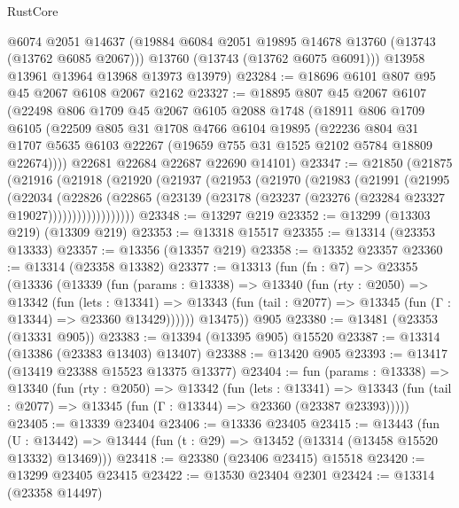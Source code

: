 \begin{lexlean}{RustCore}
\begin{coremodule}
        @6074
        @2051
        @14637
        (@19884 @6084 @2051 @19895 @14678 @13760 (@13743 (@13762 @6085 @2067)))
        @13760
        (@13743 (@13762 @6075 @6091)))
      @13958
      @13961
      @13964
      @13968
      @13973
      @13979)
@23284 := @18696 @6101 @807 @95 @45 @2067 @6108 @2067 @2162
@23327 := @18895
    @807
    @45
    @2067
    @6107
    (@22498
      @806
      @1709
      @45
      @2067
      @6105
      @2088
      @1748
      (@18911
        @806
        @1709
        @6105
        (@22509
          @805
          @31
          @1708
          @4766
          @6104
          @19895
          (@22236
            @804
            @31
            @1707
            @5635
            @6103
            @22267
            (@19659 @755 @31 @1525 @2102 @5784 @18809 @22674))))
      @22681
      @22684
      @22687
      @22690
      @14101)
@23347 := @21850
    (@21875
      (@21916
        (@21918
          (@21920
            (@21937
              (@21953
                (@21970
                  (@21983
                    (@21991
                      (@21995
                        (@22034
                          (@22826
                            (@22865
                              (@23139
                                (@23178 (@23237 (@23276 (@23284 @23327 @19027))))))))))))))))))
@23348 := @13297 @219
@23352 := @13299 (@13303 @219) (@13309 @219)
@23353 := @13318 @15517
@23355 := @13314 (@23353 @13333)
@23357 := @13356 (@13357 @219)
@23358 := @13352 @23357
@23360 := @13314 (@23358 @13382)
@23377 := @13313
    (fun (fn : @7) =>
    @23355
      (@13336
        (@13339
          (fun (params : @13338) =>
          @13340
            (fun (rty : @2050) =>
            @13342
              (fun (lets : @13341) =>
              @13343 (fun (tail : @2077) => @13345 (fun (Γ : @13344) => @23360 @13429))))))
        @13475))
    @905
@23380 := @13481 (@23353 (@13331 @905))
@23383 := @13394 (@13395 @905) @15520
@23387 := @13314 (@13386 (@23383 @13403) @13407)
@23388 := @13420 @905
@23393 := @13417 (@13419 @23388 @15523 @13375 @13377)
@23404 := fun (params : @13338) =>
  @13340
    (fun (rty : @2050) =>
    @13342
      (fun (lets : @13341) =>
      @13343 (fun (tail : @2077) => @13345 (fun (Γ : @13344) => @23360 (@23387 @23393)))))
@23405 := @13339 @23404
@23406 := @13336 @23405
@23415 := @13443
    (fun (U : @13442) => @13444 (fun (t : @29) => @13452 (@13314 (@13458 @15520 @13332) @13469)))
@23418 := @23380 (@23406 @23415) @15518
@23420 := @13299 @23405 @23415
@23422 := @13530 @23404 @2301
@23424 := @13314 (@23358 @14497)

\end{coremodule}
\end{lexlean}

